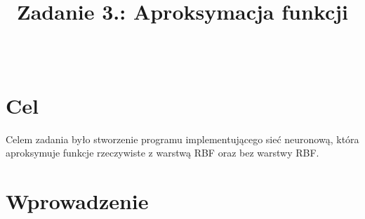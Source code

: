 \documentclass{classrep}
\author{%
    \studentinfo[216806@edu.p.lodz.pl]{Kamil Kowalewski}{216806}\\
    \studentinfo[216920@edu.p.lodz.pl]{Tomasz Witczak}{216920}%
}
\title{Zadanie 3.: Aproksymacja funkcji}
\begin{document}
    \maketitle
    \thispagestyle{fancyplain}

    \section{Cel}
    {
        Celem zadania było stworzenie programu implementującego sieć neuronową, która
        aproksymuje funkcje rzeczywiste z warstwą RBF oraz bez warstwy RBF.
    }
    \section{Wprowadzenie}
\end{document}
